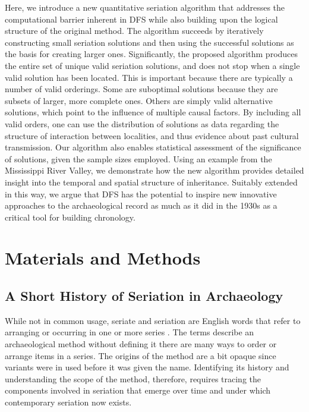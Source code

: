 \documentclass[10pt,letterpaper]{article}
\begin{document}
Here, we introduce a new quantitative seriation algorithm that addresses the computational barrier inherent in DFS while also building upon the logical structure of the original method. The algorithm succeeds by iteratively constructing small seriation solutions and then using the successful solutions as the basis for creating larger ones. Significantly, the proposed algorithm produces the entire set of unique valid seriation solutions, and does not stop when a single valid solution has been located. This is important because there are typically a number of valid orderings. Some are suboptimal solutions because they are subsets of larger, more complete ones. Others are simply valid alternative solutions, which point to the influence of multiple causal factors. By including all valid orders, one can use the distribution of solutions as data regarding the structure of interaction between localities, and thus evidence about past cultural transmission.  Our algorithm also enables statistical assessment of the significance of solutions, given the sample sizes employed. Using an example from the Mississippi River Valley, we demonstrate how the new algorithm provides detailed insight into the temporal and spatial structure of inheritance. Suitably extended in this way, we argue that DFS has the potential to inspire new innovative approaches to the archaeological record as much as it did in the 1930s as a critical tool for building chronology.


\section*{Materials and Methods}
\subsection*{A Short History of Seriation in Archaeology}

While not in common usage, seriate and seriation are English words that refer to arranging or occurring in one or more series \cite{Stein1973aa}. The terms describe an archaeological method without defining it \textemdash there are many ways to order or arrange items in a series. The origins of the method are a bit opaque since variants were in used before it was given the name. Identifying its history and understanding the scope of the method, therefore, requires tracing the components involved in seriation that emerge over time and under which contemporary seriation now exists. 
\end{document}
